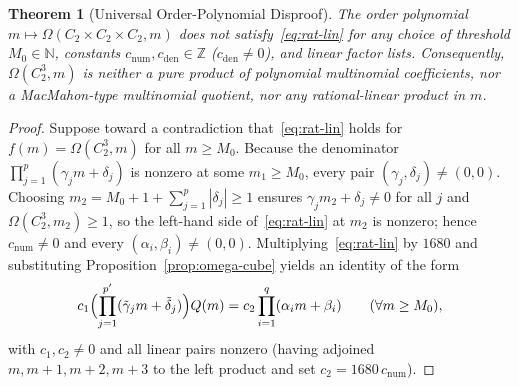 \documentclass[11pt,a4paper]{article}
\newtheorem{theorem}{Theorem}[section]
\theoremstyle{definition}
\begin{document}
\begin{theorem}[Universal Order-Polynomial Disproof]\label{thm:poly-disproof}
The order polynomial $m \mapsto \Omega(C_2 \times C_2 \times C_2, m)$ does not satisfy~\eqref{eq:rat-lin}
for any choice of threshold $M_0 \in \mathbb{N}$, constants $c_{\mathrm{num}}, c_{\mathrm{den}} \in
\mathbb{Z}$ ($c_{\mathrm{den}} \ne 0$), and linear factor lists. Consequently, $\Omega(C_2^3, m)$ is
neither a pure product of polynomial multinomial coefficients, nor a MacMahon-type multinomial
quotient, nor any rational-linear product in $m$.
\end{theorem}

\begin{proof}
Suppose toward a contradiction that~\eqref{eq:rat-lin} holds for $f(m) = \Omega(C_2^3, m)$ for all
$m \ge M_0$. Because the denominator $\prod_{j=1}^p (\gamma_j m + \delta_j)$ is nonzero at some
$m_1 \ge M_0$, every pair $(\gamma_j, \delta_j) \ne (0,0)$. Choosing $m_2 = M_0 + 1 + \sum_{j=1}^p
|\delta_j| \ge 1$ ensures $\gamma_j m_2 + \delta_j \ne 0$ for all $j$ and $\Omega(C_2^3, m_2) \ge 1$,
so the left-hand side of~\eqref{eq:rat-lin} at $m_2$ is nonzero; hence $c_{\mathrm{num}} \ne 0$ and
every $(\alpha_i, \beta_i) \ne (0,0)$. Multiplying~\eqref{eq:rat-lin} by $1680$ and substituting
Proposition~\ref{prop:omega-cube} yields an identity of the form
\begin{equation}\label{eq:quartic-lin}
  c_1 \Bigl(\prod_{j=1}^{p'} (\tilde{\gamma}_j m + \tilde{\delta}_j)\Bigr) Q(m)
  = c_2 \prod_{i=1}^q (\alpha_i m + \beta_i)
  \qquad (\forall m \ge M_0),
\end{equation}
with $c_1, c_2 \ne 0$ and all linear pairs nonzero (having adjoined $m, m+1, m+2, m+3$ to the left
product and set $c_2 = 1680\,c_{\mathrm{num}}$).


\end{proof}
\end{document}
